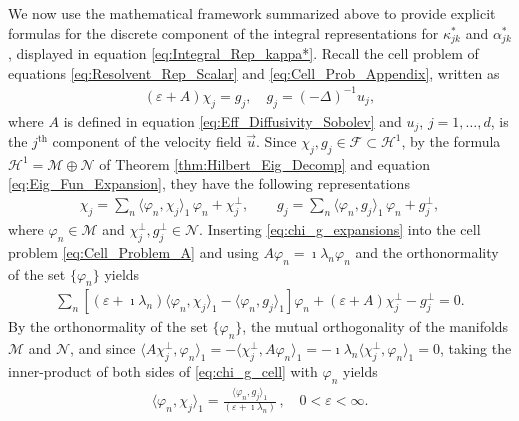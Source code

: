 \documentclass[11pt]{amsart}
\newcommand{\Hc}{\mathcal{H}}
\newcommand{\Fc}{\mathcal{F}}
\renewcommand{\Mc}{\mathcal{M}}
\newcommand{\Nc}{\mathcal{N}}
\begin{document}
We now use the mathematical framework summarized above to provide
explicit formulas for the discrete component of the integral
representations for $\kappa^*_{jk}$ and $\alpha^*_{jk}$, displayed in equation
\eqref{eq:Integral_Rep_kappa*}. Recall the cell problem of equations
\eqref{eq:Resolvent_Rep_Scalar} and \eqref{eq:Cell_Prob_Appendix},
written as 
% 
\begin{align}\label{eq:Cell_Problem_A}
  (\varepsilon+A)\chi_j=g_j, \quad g_j=(-\Delta)^{-1}u_j,
\end{align}
%
where $A$ is defined in equation \eqref{eq:Eff_Diffusivity_Sobolev} 
and $u_j$, $j=1,\ldots,d$, is the $j^{\text{th}}$ component of the velocity field
$\vec{u}$. Since $\chi_j,g_j\in\Fc\subset\Hc^1$, by the formula
$\Hc^1=\Mc\oplus\Nc$ of Theorem \ref{thm:Hilbert_Eig_Decomp} and equation
\eqref{eq:Eig_Fun_Expansion}, they have the following representations    
%
\begin{align}\label{eq:chi_g_expansions}
  \chi_j=\sum_n\langle\varphi_n,\chi_j\rangle_1\,\varphi_n +\chi_j^\perp, \qquad  g_j=\sum_n\langle\varphi_n,g_j\rangle_1\,\varphi_n +g_j^\perp,
\end{align}
%
where $\varphi_n\in\Mc$ and $\chi_j^\perp,g_j^\perp\in\Nc$. Inserting
\eqref{eq:chi_g_expansions} into the cell problem
\eqref{eq:Cell_Problem_A} and using $A\varphi_n=\imath\lambda_n\varphi_n$ and the  
orthonormality of the set $\{\varphi_n\}$ yields
%
\begin{align}\label{eq:chi_g_cell}
  \sum_n[(\varepsilon+\imath\lambda_n)\langle\varphi_n,\chi_j\rangle_1-\langle\varphi_n,g_j\rangle_1]\varphi_n+(\varepsilon+A)\chi_j^\perp-g_j^\perp=0.
\end{align}
%
By the orthonormality of the set $\{\varphi_n\}$, the mutual orthogonality of
the manifolds $\Mc$ and $\Nc$, and since
$\langle A\chi_j^\perp,\varphi_n\rangle_1=-\langle\chi_j^\perp,A\varphi_n\rangle_1=-\imath\lambda_n\langle\chi_j^\perp,\varphi_n\rangle_1=0$, taking the
inner-product of both sides of \eqref{eq:chi_g_cell} with $\varphi_n$ yields   
%
\begin{align}\label{eq:Coefficients}
  \langle\varphi_n,\chi_j\rangle_1=\frac{\langle\varphi_n,g_j\rangle_1}{(\varepsilon+\imath\lambda_n)}\,, \quad
  0<\varepsilon<\infty.
\end{align}
%
\end{document}
